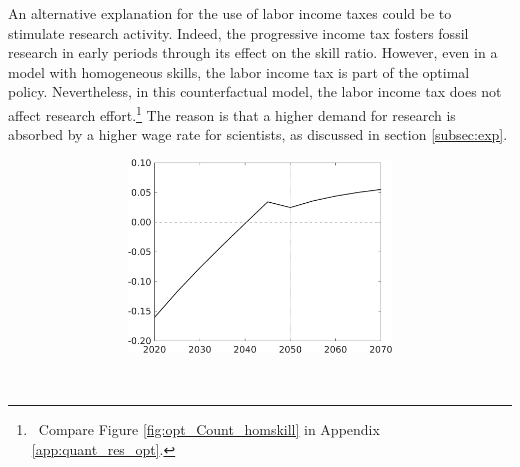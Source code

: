 An alternative explanation for the use of labor income taxes could be to stimulate research activity. 
Indeed, the progressive income tax fosters fossil research in early periods through its effect on the skill ratio. However, even in a model with homogeneous skills, the labor income tax is part of the optimal policy. Nevertheless, in this counterfactual model, the labor income tax does not affect research effort.\footnote{\ Compare Figure \ref{fig:opt_Count_homskill} in Appendix \ref{app:quant_res_opt}.}  The reason is that a higher demand for research is absorbed by a higher wage rate for scientists, as discussed in section \ref{subsec:exp}. 
\begin{figure}[h!!!]
	\centering
	\caption{Decomposing effect of combined policy}\label{fig:efftaul}
	\begin{subfigure}{1\textwidth}
		\caption{\textbf{Deviation of combined policy from carbon-tax-only policy in percent}}
		\vspace{3mm}
	\begin{subfigure}{0.4\textwidth}
		\includegraphics[width=1\textwidth]{../../codding_model/own_basedOnFried/optimalPol_010922_revision/figures/all_13Sept22_Tplus30/Tauf_OPT_T_NoTaus_COMPtaulPer_regime4_spillover0_knspil0_noskill0_sep0_xgrowth0_PV1_etaa0.79.png}
	\end{subfigure}
\begin{minipage}[]{0.1\textwidth}
\
\end{minipage}
\begin{subfigure}{0.4\textwidth}

\end{subfigure}
\end{subfigure}
\end{figure}
